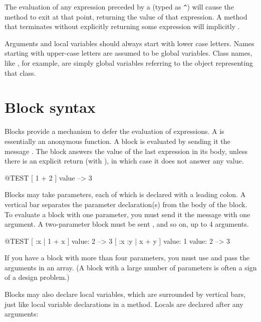\documentclass[a4paper,10pt,twoside]{book}
\begin{document}
The evaluation of any expression preceded by a \ct{^} (typed as \verb|^|) will cause the method to exit at that point, returning the value of that expression.
A method that terminates without explicitly returning some expression will implicitly  .

Arguments and local variables should always start with lower case letters.
Names starting with upper-case letters are assumed to be global variables.
Class names, like , for example, are simply global variables referring to the object representing that class.

\section{Block syntax}

Blocks provide a mechanism to defer the evaluation of expressions.
A  is essentially an anonymous function. A block is evaluated by sending it the message .
The block answers the value of the last expression in its body, unless there is an explicit return (with \ct{^}), in which case it does not answer any value.

\begin{code}{@TEST}
[ 1 + 2 ] value --> 3
\end{code}

Blocks may take parameters, each of which is declared with a leading colon.
A  vertical bar separates the parameter declaration(s) from the body of the block.
To evaluate a block with one parameter, you must send it the message  with one argument.
A two-parameter block must be sent , and so on, up to 4 arguments.

\begin{code}{@TEST}
[ :x | 1 + x ] value: 2 --> 3
[ :x :y | x + y ] value: 1 value: 2 --> 3
\end{code}

If you have a block with more than four parameters, you must use  and pass the arguments in an array.
(A block with a large number of parameters is often a sign of a design problem.)

Blocks may also declare local variables, which are surrounded by vertical bars, just like local variable declarations in a method.
Locals are declared after any arguments:
\end{document}
